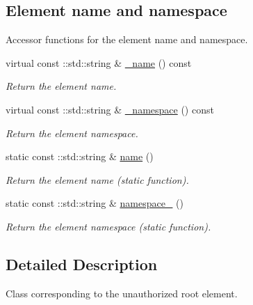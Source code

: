 \subsection*{Element name and namespace}
\label{_amgrpd4b5b61f6e07390f4af2465e04571f34}
Accessor functions for the element name and namespace. \begin{DoxyCompactItemize}
\item 
virtual const ::std::string \& \hyperlink{classopenstack_1_1xml_1_1Unauthorized_a5cebb0155d24f9461d5623034b6d48c0}{\_\-name} () const 
\begin{DoxyCompactList}\small\item\em Return the element name. \item\end{DoxyCompactList}\item 
virtual const ::std::string \& \hyperlink{classopenstack_1_1xml_1_1Unauthorized_a2dd7831b0424d5cb16258ac9d64fe253}{\_\-namespace} () const 
\begin{DoxyCompactList}\small\item\em Return the element namespace. \item\end{DoxyCompactList}\item 
static const ::std::string \& \hyperlink{classopenstack_1_1xml_1_1Unauthorized_ad51767ea5cdd858ceb1861865f07b0db}{name} ()
\begin{DoxyCompactList}\small\item\em Return the element name (static function). \item\end{DoxyCompactList}\item 
static const ::std::string \& \hyperlink{classopenstack_1_1xml_1_1Unauthorized_af5974253186630847e27533d5c9650fb}{namespace\_\-} ()
\begin{DoxyCompactList}\small\item\em Return the element namespace (static function). \item\end{DoxyCompactList}\end{DoxyCompactItemize}


\subsection{Detailed Description}
Class corresponding to the unauthorized root element. 

